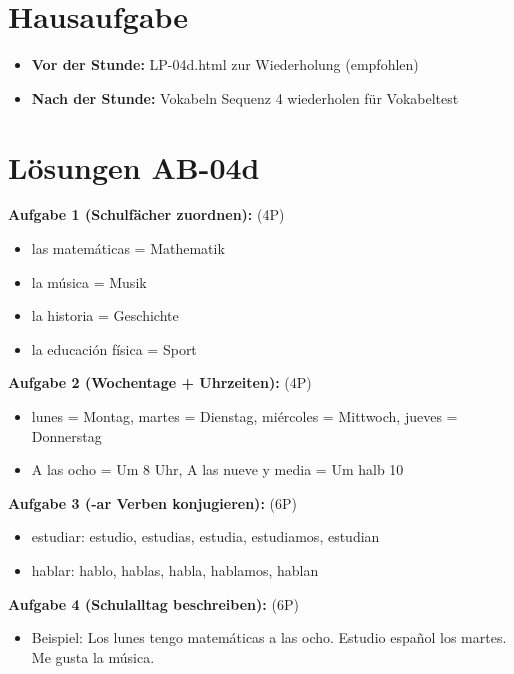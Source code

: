 \documentclass[11pt,a4paper]{article}
\begin{document}
\section{Hausaufgabe}

\begin{itemize}
    \item \textbf{Vor der Stunde:} LP-04d.html zur Wiederholung (empfohlen)
    \item \textbf{Nach der Stunde:} Vokabeln Sequenz 4 wiederholen für Vokabeltest
\end{itemize}

\section{Lösungen AB-04d}

\textbf{Aufgabe 1 (Schulfächer zuordnen):} (4P)
\begin{itemize}
    \item las matemáticas = Mathematik
    \item la música = Musik
    \item la historia = Geschichte
    \item la educación física = Sport
\end{itemize}

\textbf{Aufgabe 2 (Wochentage + Uhrzeiten):} (4P)
\begin{itemize}
    \item lunes = Montag, martes = Dienstag, miércoles = Mittwoch, jueves = Donnerstag
    \item A las ocho = Um 8 Uhr, A las nueve y media = Um halb 10
\end{itemize}

\textbf{Aufgabe 3 (-ar Verben konjugieren):} (6P)
\begin{itemize}
    \item estudiar: estudio, estudias, estudia, estudiamos, estudian
    \item hablar: hablo, hablas, habla, hablamos, hablan
\end{itemize}

\textbf{Aufgabe 4 (Schulalltag beschreiben):} (6P)
\begin{itemize}
    \item Beispiel: Los lunes tengo matemáticas a las ocho. Estudio español los martes. Me gusta la música.
\end{itemize}
\end{document}
